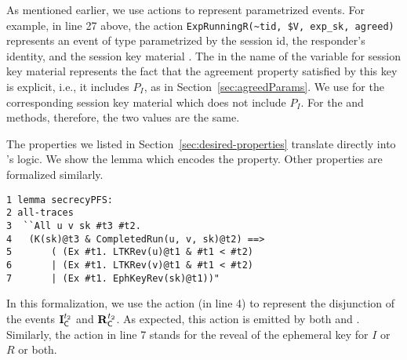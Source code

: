 As mentioned earlier, we use actions to represent parametrized events.
%
For example, in line 27 above, the action \verb|ExpRunningR(~tid, $V, exp_sk, agreed)| represents an event of type \mRStart{} parametrized by the session id, the responder's identity, and the session key material .
%
The  in the name of the variable for session key material represents the fact that the agreement property satisfied by this key is explicit, i.e., it includes $P_{I}$, as in Section~\ref{sec:agreedParams}. 
%
We use  for the corresponding session key material which does not include $P_{I}$.
%
For the \mSigSig{} and \mSigStat{} methods, therefore, the two values are the same.

%

The properties we listed in Section~\ref{sec:desired-properties} translate directly into \mTamarin's logic.
%
We show the \mTamarin{} lemma which encodes the \mPredPfs{} property. 
%
Other properties are formalized similarly. 

\begin{small}
\begin{verbatim}
1 lemma secrecyPFS:
2 all-traces
3  ``All u v sk #t3 #t2.
4   (K(sk)@t3 & CompletedRun(u, v, sk)@t2) ==>
5       ( (Ex #t1. LTKRev(u)@t1 & #t1 < #t2)
6       | (Ex #t1. LTKRev(v)@t1 & #t1 < #t2)
7       | (Ex #t1. EphKeyRev(sk)@t1))"
\end{verbatim}
\end{small}
%

In this formalization, we use the action  (in line 4) to represent the disjunction of the events $\mathbf{I}_{\textsf{C}}^{t_{2}}$ and $\mathbf{R}_{\textsf{C}}^{t_{2}}$.
%
As expected, this action is emitted by both  and .
%
Similarly, the action  in line 7 stands for the reveal of the ephemeral key for $I$ or $R$ or both.
